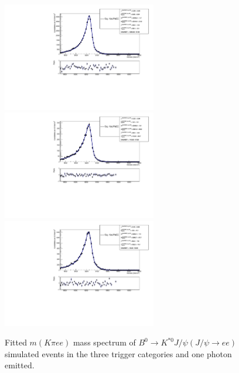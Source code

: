 %
\begin{figure}[h!]
\centering
\includegraphics[width=0.6\textwidth]{RKst/figs/fit_EEs_0_EE-q2central-gmc/KstJPsEE_1g_L0E_fitAndRes.pdf}
\includegraphics[width=0.6\textwidth]{RKst/figs/fit_EEs_0_EE-q2central-gmc/KstJPsEE_1g_L0H_fitAndRes.pdf}
\includegraphics[width=0.6\textwidth]{RKst/figs/fit_EEs_0_EE-q2central-gmc/KstJPsEE_1g_L0I_fitAndRes.pdf}
\caption{Fitted $m(K\pi ee)$ mass spectrum of $B^0 \rightarrow K^{*0} J/\psi(J/\psi\rightarrow ee)$ simulated
events in the three trigger categories and one photon emitted. }
\label{fig:FitEE_MC_inTrigCat_Brem1}
\end{figure}
%
